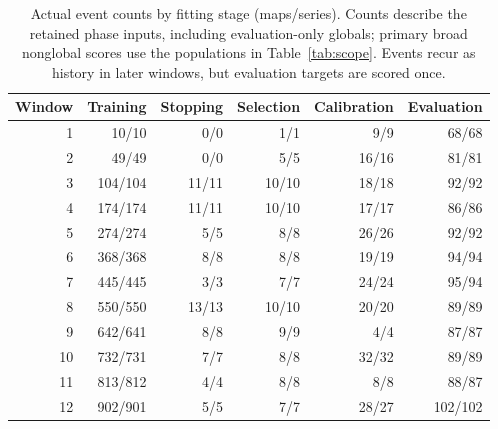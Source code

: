 \begin{table}[!t]
\centering\small
\caption{Actual event counts by fitting stage (maps/series). Counts describe the retained phase inputs, including evaluation-only globals; primary broad nonglobal scores use the populations in Table~\ref{tab:scope}. Events recur as history in later windows, but evaluation targets are scored once.}\label{tab:phase-counts}
\begin{tabular}{rrrrrr}\toprule
Window & Training & Stopping & Selection & Calibration & Evaluation \\ \midrule
1 & 10/10 & 0/0 & 1/1 & 9/9 & 68/68 \\
2 & 49/49 & 0/0 & 5/5 & 16/16 & 81/81 \\
3 & 104/104 & 11/11 & 10/10 & 18/18 & 92/92 \\
4 & 174/174 & 11/11 & 10/10 & 17/17 & 86/86 \\
5 & 274/274 & 5/5 & 8/8 & 26/26 & 92/92 \\
6 & 368/368 & 8/8 & 8/8 & 19/19 & 94/94 \\
7 & 445/445 & 3/3 & 7/7 & 24/24 & 95/94 \\
8 & 550/550 & 13/13 & 10/10 & 20/20 & 89/89 \\
9 & 642/641 & 8/8 & 9/9 & 4/4 & 87/87 \\
10 & 732/731 & 7/7 & 8/8 & 32/32 & 89/89 \\
11 & 813/812 & 4/4 & 8/8 & 8/8 & 88/87 \\
12 & 902/901 & 5/5 & 7/7 & 28/27 & 102/102 \\
\bottomrule\end{tabular}
\end{table}
